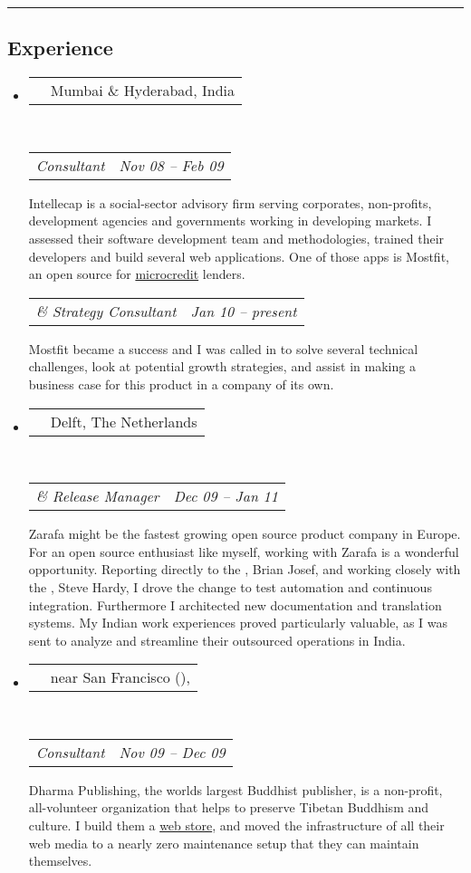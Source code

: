 \documentclass[10pt,a4paper]{article}
\makeatletter
\newcommand*\acr[1]{\textscale{.85}{#1}}
\newcommand{\headerrow}[2]
{\begin{tabular*}{\linewidth}{l@{\extracolsep{\fill}}r}
  \textscale{1.08}{\textbf{#1}} &
  {#2} \\
\end{tabular*}}
\newcommand{\subheaderrow}[2]
{\begin{tabular*}{\linewidth}{l@{\extracolsep{\fill}}r}
  \emph{#1} &
  \emph{#2} \\
\end{tabular*}}
\newcommand{\apo}{\raisebox{-.18ex}{'}{\hspace{-.1em}}}
\makeatother
\begin{document}
\hrule \vspace{-0.4em} \subsection*{Experience}

\begin{itemize} \parskip=0.1em

  \item  %
  \headerrow
    {\href{http://www.intellecap.com}{Intellecap}}
    {\sc Mumbai \& Hyderabad, India}
  \\
  \subheaderrow
    {\acr{IT} Consultant}
    {Nov \apo08 -- Feb \apo09}
  {Intellecap is a social-sector advisory firm serving corporates, non-profits, development agencies and governments working in developing markets. I assessed their software development team and methodologies, trained their developers and build several web applications. One of those apps is Mostfit, an open source \acr{MIS} for \href{http://en.wikipedia.org/wiki/Microcredit}{microcredit} lenders.
  \vspace{0.2em}}
  \\
  \subheaderrow
    {\acr{IT} \& Strategy Consultant}
    {Jan \apo10 -- present}
  Mostfit became a success and I was called in to solve several technical challenges, look at potential growth strategies, and assist in making a business case for this product in a company of its own.

  \item  %
  \headerrow
    {\href{http://www.zarafa.com}{Zarafa}}
    {\sc Delft, The Netherlands}
  \\
  \subheaderrow
    {\acr{QA} \& Release Manager}
    {Dec \apo09 -- Jan \apo11}
  Zarafa might be the fastest growing open source product company in Europe. For an open source enthusiast like myself, working with Zarafa is a wonderful opportunity. Reporting directly to the \acr{CEO}, Brian Josef, and working closely with the \acr{CTO}, Steve Hardy, I drove the change to test automation and continuous integration. Furthermore I architected new documentation and translation systems. My Indian work experiences proved particularly valuable, as I was sent to analyze and streamline their outsourced operations in India.

  \item  %
  \headerrow
    {\href{http://www.dharmapublishing.com}{Dharma Publishing}}
    {\sc near San Francisco (\acr{CA}), \acr{USA}}
  \\
  \subheaderrow
    {\acr{IT} Consultant}
    {Nov \apo09 -- Dec \apo09}
  Dharma Publishing, the worlds largest Buddhist publisher, is a non-profit, all-volunteer organization that helps to preserve Tibetan Buddhism and culture. I build them a \href{http://www.dharmapublishing.com}{web store}, and moved the infrastructure of all their web media to a nearly zero maintenance setup that they can maintain themselves.


\end{itemize}
\end{document}
